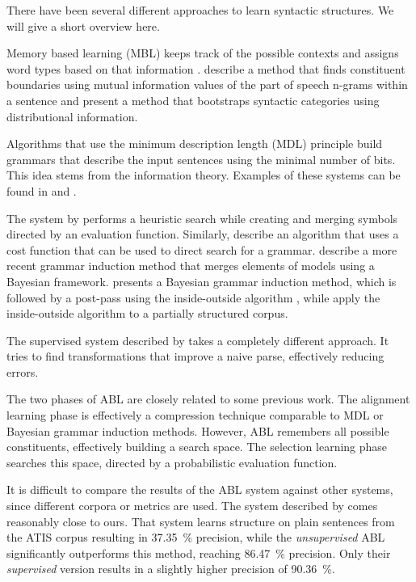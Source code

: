\documentclass[letterpaper,mlapa]{article}
\begin{document}
There have been several different approaches to learn syntactic structures. We
will give a short overview here.

Memory based learning (MBL) keeps track of the possible contexts and assigns
word types based on that information \cite{bib:mblaap}.
 describe a method that finds constituent boundaries
using mutual information values of the part of speech n-grams within a
sentence and  present a method that bootstraps
syntactic categories using distributional information.

\pagebreak
Algorithms that use the minimum description length (MDL) principle build
grammars that describe the input sentences using the minimal number of bits.
This idea stems from the information theory. Examples of these systems can be
found in  and .

The system by  performs a heuristic search
while creating and merging symbols directed by an evaluation function.
Similarly,  describe an algorithm that uses a cost
function that can be used to direct search for a grammar.
 describe a more recent grammar induction method
that merges elements of models using a Bayesian framework.
 presents a Bayesian grammar induction method, which is
followed by a post-pass using the inside-outside algorithm
\cite{bib:tgfsr,bib:teoscfgutioa}, while  apply the
inside-outside algorithm to a partially structured corpus.

The supervised system described by  takes a
completely different approach. It tries to find transformations that improve a
naive parse, effectively reducing errors.

The two phases of ABL are closely related to some previous work. The
alignment learning phase is effectively a compression technique comparable to
MDL or Bayesian grammar induction methods. However, ABL remembers all possible
constituents, effectively building a search space. The selection learning phase
searches this space, directed by a probabilistic evaluation function. 

It is difficult to compare the results of the ABL system against other systems,
since different corpora or metrics are used. The system described by
 comes reasonably close to ours. That system learns
structure on plain sentences from the ATIS corpus resulting in 37.35~\%
precision, while the \emph{unsupervised} ABL significantly outperforms this
method, reaching 86.47~\% precision. Only their \emph{supervised} version
results in a slightly higher precision of 90.36~\%.
\end{document}

